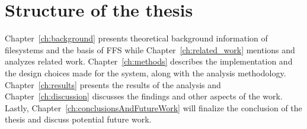 \section{Structure of the thesis} %
Chapter~\ref{ch:background} presents theoretical background information of filesystems and the basis of \gls{FFS} while Chapter~\ref{ch:related_work} mentions and analyzes related work. Chapter~\ref{ch:methods} describes the implementation and the design choices made for the system, along with the analysis methodology. Chapter~\ref{ch:results} presents the results of the analysis and Chapter~\ref{ch:discussion} discusses the findings and other aspects of the work. Lastly, Chapter~\ref{ch:conclusionsAndFutureWork} will finalize the conclusion of the thesis and discuss potential future work.